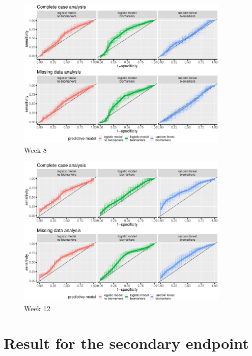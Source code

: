 \documentclass[12pt]{article}
\begin{document}
\begin{figure}[!h]
\centering
\includegraphics[trim={0 0 0 0},width=0.9\textwidth]{./../figures/ROC-pred-week8.pdf}
\caption{\label{fig:perfW8-ROC}Week 8}
\end{figure}

\begin{figure}[!h]
\centering
\includegraphics[trim={0 0 0 0},width=0.9\textwidth]{./../figures/ROC-pred-week12.pdf}
\caption{\label{fig:perfW12-ROC}Week 12}
\end{figure}


\clearpage

\section{Result for the secondary endpoint}
\label{appendix:trajectory}
\end{document}
